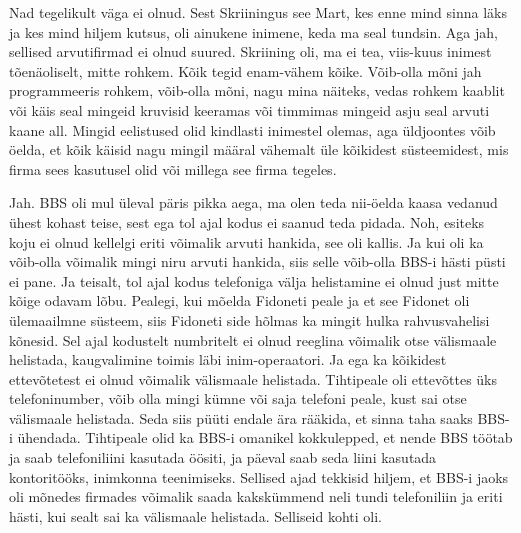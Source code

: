 
Nad tegelikult väga ei olnud. Sest Skriiningus see Mart, kes enne mind sinna 
läks ja kes mind hiljem kutsus, oli ainukene inimene, keda ma seal tundsin. Aga 
jah, sellised arvutifirmad ei olnud suured. Skriining oli, ma ei tea, viis-kuus 
inimest tõenäoliselt, mitte rohkem. Kõik tegid  enam-vähem kõike. Võib-olla 
mõni jah programmeeris rohkem, võib-olla mõni, nagu mina näiteks, vedas rohkem 
kaablit või käis seal mingeid kruvisid keeramas või timmimas mingeid asju seal 
arvuti kaane all. Mingid eelistused olid kindlasti inimestel olemas, aga 
üldjoontes võib öelda, et kõik käisid nagu mingil määral vähemalt üle kõikidest 
 süsteemidest, mis firma  sees kasutusel olid või millega see firma tegeles.


Jah. BBS  oli mul üleval päris pikka aega, ma olen teda nii-öelda kaasa vedanud 
 ühest kohast teise, sest ega tol ajal kodus ei saanud teda pidada. Noh, 
esiteks koju ei olnud kellelgi eriti võimalik arvuti hankida, see oli kallis. 
Ja kui oli ka võib-olla võimalik mingi niru arvuti hankida, siis selle  
võib-olla BBS-i hästi püsti ei pane. Ja teisalt, tol ajal kodus telefoniga 
välja helistamine ei olnud just mitte kõige odavam lõbu. Pealegi, kui mõelda 
Fidoneti peale ja et see Fidonet  oli ülemaailmne süsteem, siis Fidoneti side 
hõlmas ka mingit hulka rahvusvahelisi kõnesid. Sel ajal kodustelt numbritelt ei 
olnud reeglina võimalik otse  välismaale helistada, kaugvalimine toimis läbi 
inim-operaatori. Ja ega ka kõikidest ettevõtetest  ei olnud võimalik välismaale 
helistada. Tihtipeale oli ettevõttes üks telefoninumber, võib olla mingi kümne 
või saja telefoni peale, kust sai otse välismaale helistada. Seda siis püüti 
endale ära rääkida, et sinna taha saaks BBS-i ühendada. Tihtipeale olid ka 
BBS-i omanikel kokkulepped, et nende BBS töötab ja saab telefoniliini kasutada 
öösiti, ja päeval saab seda liini kasutada kontoritööks, inimkonna teenimiseks. 
Sellised ajad tekkisid hiljem, et BBS-i jaoks oli mõnedes firmades võimalik 
saada kakskümmend neli tundi telefoniliin ja eriti hästi, kui sealt sai ka 
välismaale helistada. Selliseid kohti oli. 

